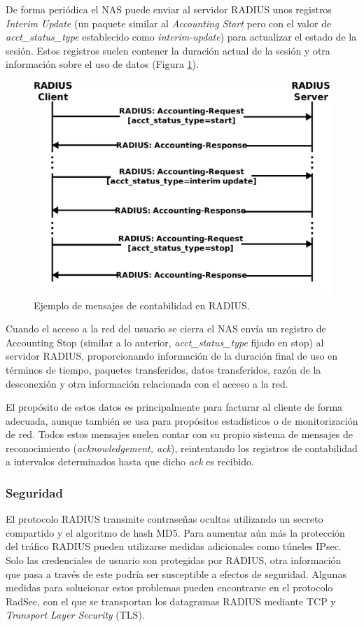 De forma periódica el NAS puede enviar al servidor RADIUS unos registros \emph{Interim Update} (un paquete similar al \emph{Accounting Start} pero con el valor de \emph{acct\_status\_type} establecido como \emph{interim-update}) para actualizar el estado de la sesión. Estos registros suelen contener la duración actual de la sesión y otra información sobre el uso de datos (Figura \ref{RADIUSCont}).

\begin{figure}[!t]
\begin{center}
\includegraphics[width=0.75\linewidth]{./3_Tecnologias/Img/RADIUSCont.png}
\end{center}
\caption{Ejemplo de mensajes de contabilidad en RADIUS.}
\label{RADIUSCont}
\end{figure}

Cuando el acceso a la red del usuario se cierra el NAS envía un registro de Accounting Stop (similar a lo anterior, \emph{acct\_status\_type} fijado en stop) al servidor RADIUS, proporcionando información de la duración final de uso en términos de tiempo, paquetes transferidos, datos transferidos, razón de la desconexión y otra información relacionada con el acceso a la red.

El propósito de estos datos es principalmente para facturar al cliente de forma adecuada, aunque también se usa para propósitos estadísticos o de monitorización de red. Todos estos mensajes suelen contar con su propio sistema de mensajes de reconocimiento (\emph{acknowledgement, ack}), reintentando los registros de contabilidad a intervalos determinados hasta que dicho \emph{ack} es recibido.

\subsubsection{Seguridad}
El protocolo RADIUS transmite contraseñas ocultas utilizando un secreto compartido y el algoritmo de hash MD5. Para aumentar aún más la protección del tráfico RADIUS pueden utilizarse medidas adicionales como túneles IPsec. Solo las credenciales de usuario son protegidas por RADIUS, otra información que pasa a través de este podría ser susceptible a efectos de seguridad. Algunas medidas para solucionar estos problemas pueden encontrarse en el protocolo RadSec, con el que se transportan los datagramas RADIUS mediante TCP y \emph{Transport Layer Security} (\acrshort{TLS}).


